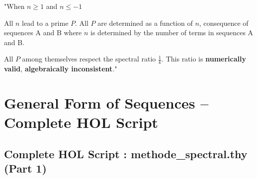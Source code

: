 \documentclass[a4paper,11pt]{article}
\begin{document}
\begin{tcolorbox}[colback=blue!5,colframe=holblue,title={\textbf{Spectral Ratio Axiomatization}}]
"When $n \geq 1$ and $n \leq -1$

All $n$ lead to a prime $P$. All $P$ are determined as a function of $n$, consequence of sequences A and B where $n$ is determined by the number of terms in sequences A and B.

All $P$ among themselves respect the spectral ratio $\frac{1}{k}$. This ratio is \textbf{numerically valid}, \textbf{algebraically inconsistent}."
\end{tcolorbox}

\newpage
\section{General Form of Sequences -- Complete HOL Script}

\subsection{Complete HOL Script : methode\_spectral.thy (Part 1)}
\end{document}
